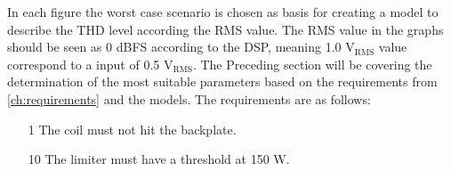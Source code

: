 In each figure the worst case scenario is chosen as basis for creating a model to describe the THD level according the RMS value. The RMS value in the graphs should be seen as 0 dBFS according to the DSP, meaning 1.0 $\text{V}_\text{RMS}$ value correspond to a input of 0.5 $\text{V}_\text{RMS}$. The Preceding section will be covering the determination of the most suitable parameters based on the requirements from \autoref{ch:requirements} and the models. The requirements are as follows:

\begin{enumerate}
\item[1] The coil must not hit the backplate.
\item[10] The limiter must have a threshold at 150 W.
\end{enumerate}









%

%